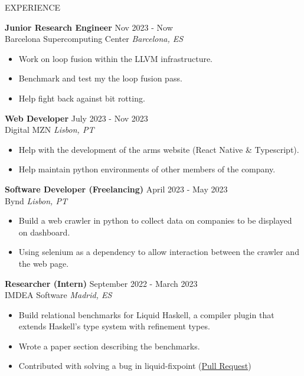 \documentclass{resume} %
\begin{document}

\begin{rSection}{EXPERIENCE}

  \textbf{Junior Research Engineer} \hfill Nov 2023 - Now\\
  Barcelona Supercomputing Center \hfill \textit{Barcelona, ES}
  \begin{itemize}
    \itemsep -3pt {}
  \item Work on loop fusion within the LLVM infrastructure.
  \item Benchmark and test my the loop fusion pass.
  \item Help fight back against bit rotting.
  \end{itemize}
  
  \textbf{Web Developer} \hfill July 2023 - Nov 2023\\
  Digital MZN \hfill \textit{Lisbon, PT}
  \begin{itemize}
    \itemsep -3pt {}
  \item Help with the development of the arms website (React Native \& Typescript).
  \item Help maintain python environments of other members of the company.
  \end{itemize}
  
  \textbf{Software Developer (Freelancing)} \hfill April 2023 - May 2023\\
  Bynd \hfill \textit{Lisbon, PT}
  \begin{itemize}
    \itemsep -3pt {}    
  \item Build a web crawler in python to collect data on companies to
    be displayed on dashboard.
  \item Using selenium as a dependency to allow interaction between the
    crawler and the web page.
  \end{itemize}

  \textbf{Researcher (Intern)} \hfill September 2022 - March 2023\\
  IMDEA Software \hfill \textit{Madrid, ES}
  \begin{itemize}
    \itemsep -3pt {}
  \item Build relational benchmarks for Liquid Haskell, a compiler plugin that extends Haskell’s type system with refinement types.
  \item Wrote a paper section describing the benchmarks.
  \item Contributed with solving a bug in liquid-fixpoint    (\href{https://github.com/ucsd-progsys/liquid-fixpoint/pull/626}{Pull Request})
  \end{itemize}
  

\end{rSection}
\end{document}
